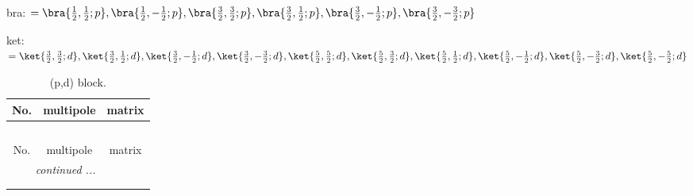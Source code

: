 \documentclass[fleqn,8pt,landscape]{jsarticle}
\begin{document}
bra: $=\bra{\frac{1}{2},\frac{1}{2};p}, \bra{\frac{1}{2},- \frac{1}{2};p}, \bra{\frac{3}{2},\frac{3}{2};p}, \bra{\frac{3}{2},\frac{1}{2};p}, \bra{\frac{3}{2},- \frac{1}{2};p}, \bra{\frac{3}{2},- \frac{3}{2};p}$

\noindent
ket: $=\ket{\frac{3}{2},\frac{3}{2};d}, \ket{\frac{3}{2},\frac{1}{2};d}, \ket{\frac{3}{2},- \frac{1}{2};d}, \ket{\frac{3}{2},- \frac{3}{2};d}, \ket{\frac{5}{2},\frac{5}{2};d}, \ket{\frac{5}{2},\frac{3}{2};d}, \ket{\frac{5}{2},\frac{1}{2};d}, \ket{\frac{5}{2},- \frac{1}{2};d}, \ket{\frac{5}{2},- \frac{3}{2};d}, \ket{\frac{5}{2},- \frac{5}{2};d}$
\renewcommand{\arraystretch}{1.6}
\begin{longtable}{ccc}
\caption{(p,d) block.}
 \\
 \hline \hline
No. & multipole & matrix \\ \hline \endfirsthead

\multicolumn{2}{l}{\tablename\ \thetable{}} \\
 \hline \hline
No. & multipole & matrix \\ \hline \endhead

 \hline \hline
\multicolumn{2}{r}{\footnotesize\it continued ...} \\ \endfoot

 \hline \hline
\multicolumn{2}{r}{} \\ \endlastfoot


\end{longtable}
\end{document}
